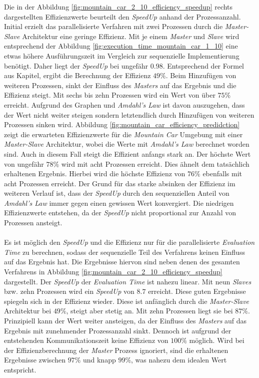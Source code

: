 Die in der Abbildung \ref{fig:mountain_car_2_10_efficiency_speedup} rechts dargestellten Effizienzwerte beurteilt den \emph{SpeedUp} anhand der Prozessanzahl. Initial erzielt das parallelisierte Verfahren mit zwei Prozessen durch die \emph{Master-Slave} Architektur eine geringe Effizienz. Mit je einem \emph{Master} und \emph{Slave} wird entsprechend der Abbildung \ref{fig:execution_time_mountain_car_1_10} eine etwas höhere Ausführungszeit im Vergleich zur sequenzielle Implementierung benötigt. Daher liegt der \emph{SpeedUp} bei ungefähr $0.98$. Entsprechend der Formel aus Kapitel,  ergibt die Berechnung der Effizienz $49\%$. Beim Hinzufügen von weiteren Prozessen, sinkt der Einfluss des \emph{Masters} auf das Ergebnis und die Effizienz steigt. Mit sechs bis zehn Prozessen wird ein Wert von über $75\%$ erreicht. Aufgrund des Graphen und \emph{Amdahl's Law} ist davon auszugehen, dass der Wert nicht weiter steigen sondern letztendlich durch Hinzufügen von weiteren Prozessen sinken wird. Abbildung \ref{fig:mountain_car_efficiency_predidction} zeigt die erwarteten Effizienzwerte für die \emph{Mountain Car} Umgebung mit einer \emph{Master-Slave} Architektur, wobei die Werte mit \emph{Amdahl's Law} berechnet worden sind. Auch in diesem Fall steigt die Effizient anfangs stark an. Der höchste Wert von ungefähr $78\%$ wird mit acht Prozessen erreicht. Dies ähnelt dem tatsächlich erhaltenen Ergebnis. Hierbei wird die höchste Effizienz von $76\%$ ebenfalls mit acht Prozessen erreicht. Der Grund für das starke absinken der Effizienz im weiteren Verlauf ist, dass der \emph{SpeedUp} durch den sequenziellen Anteil von \emph{Amdahl's Law} immer gegen einen gewissen Wert konvergiert. Die niedrigen Effizienzwerte entstehen, da der \emph{SpeedUp} nicht proportional zur Anzahl von Prozessen ansteigt.
\\\\
Es ist möglich den \emph{SpeedUp} und die Effizienz nur für die parallelisierte \emph{Evaluation Time} zu berechnen, sodass der sequenzielle Teil des Verfahrens keinen Einfluss auf das Ergebnis hat. Die Ergebnisse hiervon sind neben denen des gesamten Verfahrens in Abbildung \ref{fig:mountain_car_2_10_efficiency_speedup} dargestellt. Der \emph{SpeedUp} der \emph{Evaluation Time} ist nahezu linear. Mit neun \emph{Slaves} bzw. zehn Prozessen wird ein \emph{SpeedUp} von $8.7$ erreicht. Diese guten Ergebnisse spiegeln sich in der Effizienz wieder. Diese ist anfänglich durch die \emph{Master-Slave} Architektur bei $49\%$, steigt aber stetig an. Mit zehn Prozessen liegt sie bei $87\%$. Prinzipiell kann der Wert weiter ansteigen, da der Einfluss des \emph{Masters} auf das Ergebnis mit zunehmender Prozessanzahl sinkt. Dennoch ist aufgrund der entstehenden Kommunikationszeit keine Effizienz von $100\%$ möglich. Wird bei der Effizienzberechnung der \emph{Master} Prozess ignoriert, sind die erhaltenen Ergebnisse zwischen $97\%$ und knapp $99\%$, was nahezu dem idealen Wert entspricht. 

